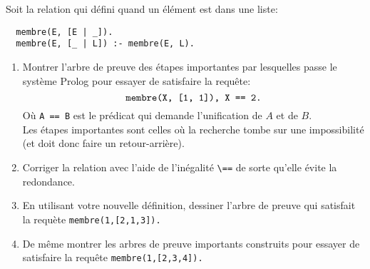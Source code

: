\begin{Exercise}
Soit la relation  qui défini quand un élément est dans une liste:
\begin{verbatim}
  membre(E, [E | _]).
  membre(E, [_ | L]) :- membre(E, L).
\end{verbatim}
\begin{enumerate}
\item Montrer l'arbre de preuve des étapes importantes par lesquelles passe
  le système Prolog pour essayer de satisfaire la requête:
  \begin{displaymath}
    \verb|membre(X, [1, 1]), X == 2.|
  \end{displaymath}
  Où \texttt{A == B} est le prédicat qui demande l'unification de $A$ et de
  $B$. \\
  Les étapes importantes sont celles où la recherche tombe sur une
  impossibilité (et doit donc faire un retour-arrière).%
\item Corriger la relation avec l'aide de l'inégalité \verb|\==| de sorte
  qu'elle évite la redondance.
\item En utilisant votre nouvelle définition, dessiner l'arbre de preuve
  qui satisfait la requète \verb|membre(1,[2,1,3]).|
\item De même montrer les arbres de preuve importants construits pour essayer
  de satisfaire la requête \verb|membre(1,[2,3,4]).|
\end{enumerate}
\end{Exercise}